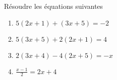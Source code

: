 
Résoudre les équations suivantes
\begin{enumerate}
\item $5(2x+1)+(3x+5)=-2$
\item $5(3x+5)+2(2x+1)=4$
\item $2(3x+4)-4(2x+5)=-x$
\item $\frac{x-1}{2}=2x+4$
\end{enumerate}